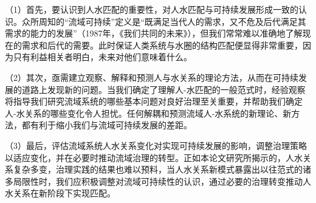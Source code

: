 （1）首先，要认识到人水匹配的重要性，对人水匹配与可持续发展形成一致的认识。众所周知的“流域可持续”定义是“既满足当代人的需求，又不危及后代满足其需求的能力的发展”（1987年，《我们共同的未来》），但我们常常难以准确地了解现在的需求和后代的需要。此时保证人类系统与水圈的结构匹配便显得非常重要，因为只有利益相关者明白，未来对他们意味着什么。

（2）其次，亟需建立观察、解释和预测人与水关系的理论方法，从而在可持续发展的道路上发现新的问题。当我们确定了理解人-水匹配的一般范式时，经验观察将指导我们研究流域系统的哪些基本问题对良好治理至关重要，并帮助我们确定人-水关系的哪些变化令人担忧。任何解耦和预测流域人-水系统的新理论、新方法，都有利于缩小我们与流域可持续发展的差距。

（3）最后，评估流域系统人水关系变化对实现可持续发展的影响，调整治理策略以适应变化，并在必要时推动流域治理的转型。正如本论文研究所揭示的，人水关系复杂多变，治理实践的结果也难以预料，当人水关系新模式暴露出以往范式的诸多局限性时，我们应积极调整对流域可持续性的认识，通过必要的治理转变推动人水关系在新阶段下实现匹配。
